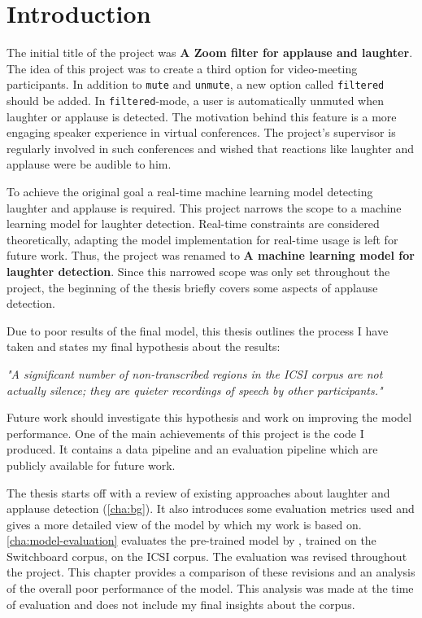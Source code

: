 \documentclass[bsc,frontabs,parskip,deptreport]{infthesis}
\begin{document}
\chapter{Introduction} \label{sec:intro}

The initial title of the project was \textbf{A Zoom filter for applause and laughter}. The idea of this project was to create a third option for video-meeting participants. In addition to \texttt{mute} and \texttt{unmute}, a new option called \texttt{filtered} should be added.
In \texttt{filtered}-mode, a user is automatically unmuted when laughter or applause is detected. 
The motivation behind this feature is a more engaging speaker experience in virtual conferences. The project's supervisor is regularly involved in such conferences and wished that reactions like laughter and applause were be audible to him.

To achieve the original goal a real-time machine learning model detecting laughter and applause is required.  
This project narrows the scope to a machine learning model for laughter detection. Real-time constraints are considered theoretically, adapting the model implementation for real-time usage is left for future work.
Thus, the project was renamed to \textbf{A machine learning model for laughter detection}.
Since this narrowed scope was only set throughout the project, the beginning of the thesis briefly covers some aspects of applause detection. 

Due to poor results of the final model, this thesis outlines the process I have taken and states my final hypothesis about the results: 

\textit{"A significant number of non-transcribed regions in the ICSI corpus are not actually silence; they are quieter recordings of speech by other participants."}

Future work should investigate this hypothesis and work on improving the model performance.
One of the main achievements of this project is the code I produced. 
It contains a data pipeline and an evaluation pipeline which are publicly available for future work. 

The thesis starts off with a review of existing approaches about laughter and applause detection (\autoref{cha:bg}). It also introduces some evaluation metrics used and gives a more detailed view of the model by \citet{gillick2021robust} which my work is based on. \autoref{cha:model-evaluation} evaluates the pre-trained model by \citet{gillick2021robust}, trained on the Switchboard \citep{switchboard-corpus} corpus, on the ICSI corpus\citep{morgan2001meeting}. The evaluation was revised throughout the project. This chapter provides a comparison of these revisions and an analysis of the overall poor performance of the model. This analysis was made at the time of evaluation and does not include my final insights about the corpus.
\end{document}

